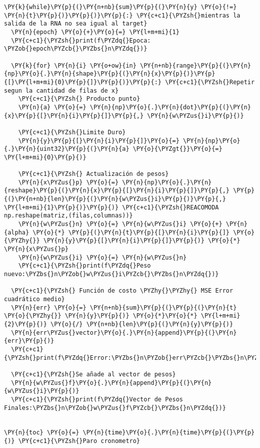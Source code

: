     \begin{tcolorbox}[breakable, size=fbox, boxrule=1pt, pad at break*=1mm,colback=cellbackground, colframe=cellborder]
\begin{Verbatim}[commandchars=\\\{\}]
\PY{k}{while}\PY{p}{(}\PY{n+nb}{sum}\PY{p}{(}\PY{n}{y} \PY{o}{!=} \PY{n}{t}\PY{p}{)}\PY{p}{)}\PY{p}{:} \PY{c+c1}{\PYZsh{}mientras la salida de la RNA no sea igual al target}
  \PY{n}{epoch} \PY{o}{+}\PY{o}{=} \PY{l+m+mi}{1}
  \PY{c+c1}{\PYZsh{}print(f\PYZdq{}Epoca: \PYZob{}epoch\PYZcb{}\PYZbs{}n\PYZdq{})}

  \PY{k}{for} \PY{n}{i} \PY{o+ow}{in} \PY{n+nb}{range}\PY{p}{(}\PY{n}{np}\PY{o}{.}\PY{n}{shape}\PY{p}{(}\PY{n}{x}\PY{p}{)}\PY{p}{[}\PY{l+m+mi}{0}\PY{p}{]}\PY{p}{)}\PY{p}{:} \PY{c+c1}{\PYZsh{}Repetir segun la cantidad de filas de x}
    \PY{c+c1}{\PYZsh{} Producto punto}
    \PY{n}{a} \PY{o}{=} \PY{n}{np}\PY{o}{.}\PY{n}{dot}\PY{p}{(}\PY{n}{x}\PY{p}{[}\PY{n}{i}\PY{p}{]}\PY{p}{,} \PY{n}{w\PYZus{}i}\PY{p}{)}

    \PY{c+c1}{\PYZsh{}Limite Duro}
    \PY{n}{y}\PY{p}{[}\PY{n}{i}\PY{p}{]}\PY{o}{=} \PY{n}{np}\PY{o}{.}\PY{n}{uint32}\PY{p}{(}\PY{n}{a} \PY{o}{\PYZgt{}}\PY{o}{=} \PY{l+m+mi}{0}\PY{p}{)}

    \PY{c+c1}{\PYZsh{} Actualización de pesos}
    \PY{n}{x\PYZus{}p} \PY{o}{=} \PY{n}{np}\PY{o}{.}\PY{n}{reshape}\PY{p}{(}\PY{n}{x}\PY{p}{[}\PY{n}{i}\PY{p}{]}\PY{p}{,} \PY{p}{(}\PY{n+nb}{len}\PY{p}{(}\PY{n}{w\PYZus{}i}\PY{p}{)}\PY{p}{,} \PY{l+m+mi}{1}\PY{p}{)}\PY{p}{)} \PY{c+c1}{\PYZsh{}REACOMODA np.reshape(matriz,(filas,columnas))}
    \PY{n}{w\PYZus{}n} \PY{o}{=} \PY{n}{w\PYZus{}i} \PY{o}{+} \PY{n}{alpha} \PY{o}{*} \PY{p}{(}\PY{n}{t}\PY{p}{[}\PY{n}{i}\PY{p}{]} \PY{o}{\PYZhy{}} \PY{n}{y}\PY{p}{[}\PY{n}{i}\PY{p}{]}\PY{p}{)} \PY{o}{*} \PY{n}{x\PYZus{}p}
    \PY{n}{w\PYZus{}i} \PY{o}{=} \PY{n}{w\PYZus{}n}
    \PY{c+c1}{\PYZsh{}print(f\PYZdq{}Peso nuevo:\PYZbs{}n\PYZob{}w\PYZus{}i\PYZcb{}\PYZbs{}n\PYZdq{})}
 
  \PY{c+c1}{\PYZsh{} Función de costo \PYZhy{}\PYZhy{} MSE Error cuadrático medio}
  \PY{n}{err} \PY{o}{=} \PY{n+nb}{sum}\PY{p}{(}\PY{p}{(}\PY{n}{t} \PY{o}{\PYZhy{}} \PY{n}{y}\PY{p}{)} \PY{o}{*}\PY{o}{*} \PY{l+m+mi}{2}\PY{p}{)} \PY{o}{/} \PY{n+nb}{len}\PY{p}{(}\PY{n}{y}\PY{p}{)}
  \PY{n}{err\PYZus{}vector}\PY{o}{.}\PY{n}{append}\PY{p}{(}\PY{n}{err}\PY{p}{)}
  \PY{c+c1}{\PYZsh{}print(f\PYZdq{}Error:\PYZbs{}n\PYZob{}err\PYZcb{}\PYZbs{}n\PYZdq{})}

  \PY{c+c1}{\PYZsh{}Se añade al vector de pesos}
  \PY{n}{w\PYZus{}f}\PY{o}{.}\PY{n}{append}\PY{p}{(}\PY{n}{w\PYZus{}i}\PY{p}{)}
  \PY{c+c1}{\PYZsh{}print(f\PYZdq{}Vector de Pesos Finales:\PYZbs{}n\PYZob{}w\PYZus{}f\PYZcb{}\PYZbs{}n\PYZdq{})}


\PY{n}{toc} \PY{o}{=} \PY{n}{time}\PY{o}{.}\PY{n}{time}\PY{p}{(}\PY{p}{)} \PY{c+c1}{\PYZsh{}Paro cronometro}
\end{Verbatim}
\end{tcolorbox}

